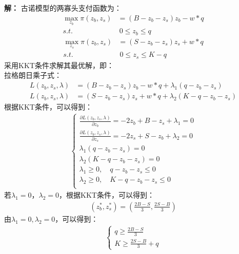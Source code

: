 \documentclass[10pt,a4paper]{article}
\begin{document}
\vspace{5pt}
\noindent
{\bf 解：}
古诺模型的两寡头支付函数为：
\begin{align*}
	\max_{z_{b}} \pi(z_{b},z_{s}) & =(B-z_{b}-z_{s})z_{b}-w*q    \\
	s.t.                          & \  0 \leq z_{b} \leq q
\end{align*}
\begin{align*}
	\max_{z_{s}} \pi(z_{b},z_{s}) & =(S-z_{b}-z_{s})z_{s}+w*q      \\
	s.t.                          & \  0 \leq z_{s} \leq K-q
\end{align*}
采用KKT条件求解其最优解，即：\\
拉格朗日乘子式：
\begin{align*}
	L\left( z_{b},z_{s},\lambda  \right) & =(B-z_{b}-z_{s})z_{b}-w*q +\lambda_{1} \left( q-z_{b}-z_{s} \right)   \\
	L\left( z_{b},z_{s},\lambda  \right) & =(S-z_{b}-z_{s})z_{s}+w*q +\lambda_{2} \left( K-q-z_{b}-z_{s} \right)
\end{align*}
根据KKT条件，可以得到：
\begin{align*}
	\left\{
	\begin{matrix}
		\frac{\partial L\left( z_{b},z_{s},\lambda \right)}{\partial z_{b}} = -2 z_{b} + B - z_{s} + \lambda_{1} = 0 \\
		\frac{\partial L\left( z_{b},z_{s},\lambda \right)}{\partial z_{s}} = -2 z_{s} + S - z_{b} + \lambda_{2} = 0 \\
		\lambda_{1} \left( q - z_{b} - z_{s} \right) = 0                                                             \\
		\lambda_{2} \left( K - q - z_{b} - z_{s} \right) = 0                                                         \\
		\lambda_{1} \geq 0, \quad q - z_{b} - z_{s} \leq 0                                                           \\
		\lambda_{2} \geq 0, \quad K - q - z_{b} - z_{s} \leq 0                                                       \\
	\end{matrix}
	\right.
\end{align*}
若$\lambda_{1} = 0$，$\lambda_{2} = 0$，根据KKT条件，可以得到：
\begin{align*}
	(z_{b}^{*},z_{s}^{*}) = \left( \frac{2B - S}{3},\frac{2S - B}{3} \right)
\end{align*}
由$\lambda_{1}=0,\lambda_{2}=0$，可以得到：
\begin{align*}
	\left\{
	\begin{matrix}
		q \geq \frac{2B - S}{3} \\
		K  \geq \frac{2S - B}{3} + q
	\end{matrix}
	\right.
\end{align*}
\end{document}

